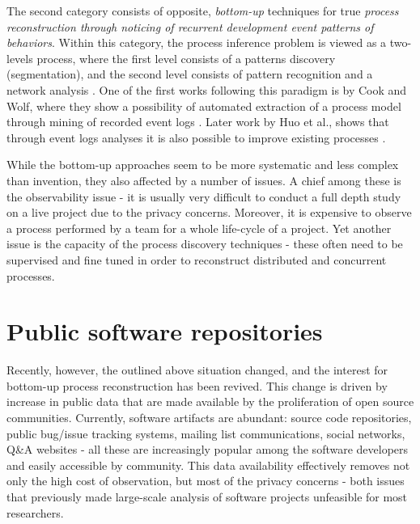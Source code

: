 The second category consists of opposite, \textit{bottom-up} techniques for true \textit{process reconstruction 
through noticing of recurrent development event patterns of behaviors}. 
Within this category, the process inference problem is viewed as a two-levels process, 
where the first level consists of a patterns discovery (segmentation), and the 
second level consists of pattern recognition and a network analysis \cite{citeulike:2703162}.
One of the first works following this paradigm is by Cook and Wolf, where they show a
possibility of automated extraction of a process model through mining of recorded event logs
\cite{citeulike:328044} \cite{citeulike:5120757} \cite{citeulike:5128143}. 
Later work by Huo et al., shows that through event logs analyses it is also possible to 
improve existing processes \cite{citeulike:7691059} \cite{citeulike:7690766}. 

While the bottom-up approaches seem to be more systematic and less complex than invention, they 
also affected by a number of issues. A chief among these is the observability issue - 
it is usually very difficult to conduct a full depth study on a live project due to the privacy concerns. 
Moreover, it is expensive to observe a process performed by a team for a whole life-cycle of a project. 
Yet another issue is the capacity of the process discovery techniques - these often need to be supervised 
and fine tuned in order to reconstruct distributed and concurrent processes. 

\section{Public software repositories}\label{section_public_repositories}
Recently, however, the outlined above situation changed, and the interest for bottom-up process 
reconstruction has been revived. 
This change is driven by increase in public data that are made available by the proliferation of 
open source communities.
Currently, software artifacts are abundant: source code repositories, public bug/issue tracking systems, 
mailing list communications, social networks, Q\&A websites - all these are increasingly popular among
the software developers and easily accessible by community. 
This data availability effectively removes not only the high cost of observation, but most of the privacy 
concerns - both issues that previously made large-scale analysis of software projects unfeasible for 
most researchers.


